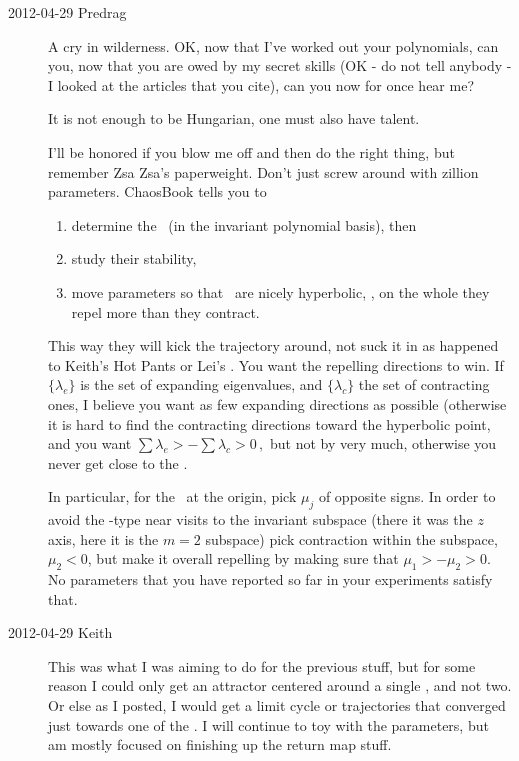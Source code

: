 \begin{description}
\item[2012-04-29 Predrag] A cry in wilderness. OK, now that I've worked
out your polynomials, can you, now that you are owed by my secret skills
(OK - do not tell anybody - I looked at the articles that you cite), can
you now for once {\color{red}hear} me?

\begin{bartlett}{
It is not enough to be Hungarian, one must also have talent.
        }
\end{bartlett}

I'll be honored if you blow me off and then do the right thing, but remember
Zsa Zsa's paperweight.
Don't just screw around with zillion parameters. ChaosBook tells you to
\begin{enumerate}
  \item determine the \eqva\ (in the invariant polynomial basis), then
  \item study their stability,
  \item move parameters so that \eqva\ are nicely
        hyperbolic, \ie, on the whole they repel more than they contract.
\end{enumerate}
This way they will kick the trajectory around, not suck it in as happened
to Keith's Hot Pants or Lei's . You want the
repelling directions to win. If $\{\lambda_e\}$ is the set of expanding
eigenvalues, and $\{\lambda_c\}$ the set of contracting ones, I believe
you want as few expanding directions as possible (otherwise it is hard to
find the contracting directions toward the hyperbolic point, and you want
\(
\sum \lambda_e > - \sum \lambda_c >0
\,,\)
but not by very much, otherwise you never get close to the \eqv.

In particular, for the \eqv\ at the origin, pick $\mu_j$ of opposite
signs. In order to avoid the \cLe-type  near visits to the invariant
subspace (there it was the $z$ axis, here it is the $m=2$ subspace) pick
contraction within the subspace, $\mu_2 < 0$, but make it overall
repelling by making sure that $\mu_1 > -\mu_2 > 0$. {\color{red}No
parameters that you have reported so far in your experiments satisfy that.}


\item[2012-04-29 Keith]  This was what I was aiming to do for the
previous stuff, but for some reason I could only get an attractor
centered around a single \template, and not two.  Or else as I posted, I
would get a limit cycle or trajectories that converged just towards one
of the \eqva.  I will continue to toy with the parameters, but am mostly
focused on finishing up the return map stuff.


\end{description}
